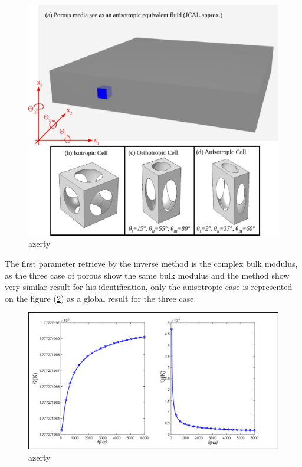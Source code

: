\documentclass{article}
\begin{document}
    \begin{figure}[ht!]
        \centering
        \includegraphics[scale=0.5]{Material_2.png}
        \caption{azerty}
        \label{Material}
    \end{figure}

The first parameter retrieve by the inverse method is the complex bulk modulus, as the three case of porous show the same bulk modulus and the method show very similar result for his identification, only the anisotropic case is represented on the figure (\ref{Grph_K}) as a global result for the three case.

    \begin{figure}[ht!]
        \centering
        \includegraphics[scale=0.3]{Bulk.png}
        \caption{azerty}
        \label{Grph_K}
    \end{figure}
    
\end{document}
